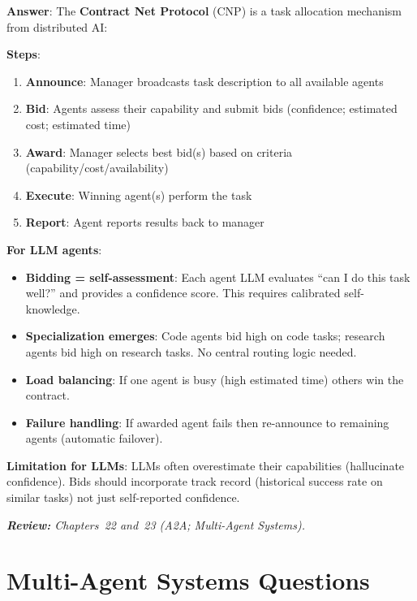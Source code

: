 \begin{questionbox}
\textbf{Answer}: The \textbf{Contract Net Protocol} (CNP) is a task allocation mechanism from distributed AI:

\textbf{Steps}:

\begin{enumerate}
  \item \textbf{Announce}: Manager broadcasts task description to all available agents
  \item \textbf{Bid}: Agents assess their capability and submit bids (confidence; estimated cost; estimated time)
  \item \textbf{Award}: Manager selects best bid(s) based on criteria (capability/cost/availability)
  \item \textbf{Execute}: Winning agent(s) perform the task
  \item \textbf{Report}: Agent reports results back to manager
\end{enumerate}

\textbf{For LLM agents}:

\begin{itemize}
  \item \textbf{Bidding = self-assessment}: Each agent LLM evaluates ``can I do this task well?'' and provides a confidence score. This requires calibrated self-knowledge.
  \item \textbf{Specialization emerges}: Code agents bid high on code tasks; research agents bid high on research tasks. No central routing logic needed.
  \item \textbf{Load balancing}: If one agent is busy (high estimated time) others win the contract.
  \item \textbf{Failure handling}: If awarded agent fails then re-announce to remaining agents (automatic failover).
\end{itemize}

\textbf{Limitation for LLMs}: LLMs often overestimate their capabilities (hallucinate confidence). Bids should incorporate track record (historical success rate on similar tasks) not just self-reported confidence.

\emph{\textbf{Review:} Chapters~22 and~23 (A2A; Multi-Agent Systems).}
\end{questionbox}

\section{Multi-Agent Systems Questions}
\label{multi-agent-systems-questions}

